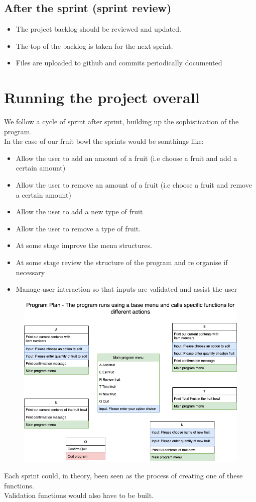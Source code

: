 \documentclass[a4paper,12pt]{article}
\begin{document}
\subsection{After the sprint (sprint review)}
\begin{itemize}
	\item The project backlog should be reviewed and updated.
	\item The top of the backlog is taken for the next sprint.
	\item Files are uploaded to github and commits periodically documented
\end{itemize}

\section{Running the project overall}
We follow a cycle of sprint after sprint, building up the sophistication of the program.\\
In the case of our fruit bowl the sprints would be somthings like:
\begin{itemize}
	\item Allow the user to add an amount of a fruit  (i.e choose a fruit and add a certain amount)
	\item Allow the user to remove an amount of a fruit  (i.e choose a fruit and remove a certain amount)
	\item Allow the user to add a new type of fruit
	\item Allow the user to remove a type of fruit.
	\item At some stage improve the menu structures.
	\item At some stage review the structure of the program and re organise if necessary
	\item Manage user interaction so that inputs are validated and assist the user 
\end{itemize}

\begin{figure}[!ht]
	\centering
	\includegraphics[width=12cm]{images/GeneralPlanning-Fruit_Structure.png}
\end{figure}
Each sprint could, in theory, been seen as the process of creating one of these functions.\\
Validation functions would also have to be built.
\newpage
\end{document}
